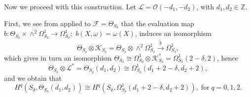 \documentclass{amsart} %
\theoremstyle{definition}
\newcommand{\cts}{\Theta_{S_{\delta}}}
\newcommand{\cs}{S_{\delta}}
\newcommand{\mcL}{\mathcal{L}}
\newcommand{\mcO}{\mathcal{O}}
\newcommand{\mcK}{\mathcal{K}}
\newcommand{\mcF}{\mathcal{F}}
\begin{document}
Now we proceed with this construction. Let $\mcL=\mcO(-d_1,-d_2) $, with $d_1,d_2\in \mathbb{Z}$.

 First, we see from \cite[Section II, Exercise 5.16 (b)]{Hartshorne} applied to $ \mcF = \Theta_{\cs} $
 that the evaluation map
  $ b : \Theta_{\cs} \times \wedge^2 \Omega_{\cs}^1 \longrightarrow \Omega_{\cs}^1; $
  $  b( X, \omega) = \omega( X ) $,  induces an isomorphism
 $$ \Theta_{\cs}\otimes \mcK_{\cs} = \Theta_{\cs} \otimes \wedge^2 \Omega_{\cs}^1
 \xrightarrow{\tilde{b}} \Omega_{\cs}^1,
 $$
 which gives in turn an isomorphism %
 $ \Theta_{\cs} \cong
 \Omega_{\cs}^1 \otimes \mcK_{\cs}^* = \Omega_{\cs}^1(2-\delta, 2) $, hence
 $$ \Theta_{\cs}\otimes \mcL^* = \Theta_{\cs}( d_1, d_2 ) \cong \Omega_{\cs}^1( d_1 + 2 - \delta, d_2 + 2), $$
and we obtain that
\begin{equation}\label{CTanCCotan}
  H^q( \cs, \Theta_{\cs}( d_1, d_2) )\cong H^q( \cs, \Omega_{\cs}^1( d_1 + 2 - \delta, d_2 + 2) ), \;
  \text{for}\; q = 0, 1, 2.
\end{equation}
\end{document}
